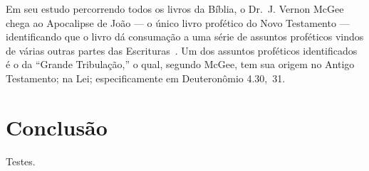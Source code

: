     Em seu estudo percorrendo todos os livros da Bíblia, o Dr.~J. Vernon McGee chega ao Apocalipse de João  ---  o  único  livro
    profético do Novo Testamento --- identificando que o livro dá consumação a uma série de assuntos proféticos vindos de várias
    outras partes das  Escrituras~\cite{ca1980-McGeeJV-49Rev}.  Um  dos  assuntos  proféticos  identificados  é  o  da  ``Grande
    Tribulação,'' o qual, segundo McGee, tem sua origem no Antigo Testamento; na Lei; especificamente em Deuteronômio 4.30,~31.



\section{Conclusão}

    Testes.

